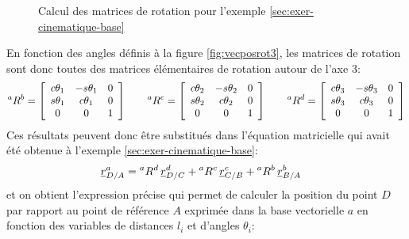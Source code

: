%
\begin{figure}[H]
        \centering
				\hspace{10pt}
				\hspace{10pt}
        \caption{Calcul des matrices de rotation pour l'exemple \ref{sec:exer-cinematique-base}}
				\label{fig:exer-cinematique-base-rotation}
\end{figure}
%
En fonction des angles définis à la figure \ref{fig:vecposrot3}, les matrices de rotation sont donc toutes des matrices élémentaires de rotation autour de l'axe 3:
\begin{align}
{}^aR^b =
\left[ \begin{array}{c c c}
	c\theta_1 & -s\theta_1 & 0 \\
	s\theta_1 & c\theta_1 & 0 \\
	0 & 0 & 1 
\end{array}  \right]
\quad \quad
 {}^aR^c =
\left[ \begin{array}{c c c}
	c\theta_2 & -s\theta_2 & 0 \\
	s\theta_2 & c\theta_2 & 0 \\
	0 & 0 & 1 
\end{array}  \right]
\quad \quad
{}^aR^d =
\left[ \begin{array}{c c c}
	c\theta_3 & -s\theta_3 & 0 \\
	s\theta_3 & c\theta_3 & 0 \\
	0 & 0 & 1 
\end{array}  \right]
\end{align} 
Ces résultats peuvent donc être substitués dans l'équation matricielle qui avait été obtenue à l'exemple \ref{sec:exer-cinematique-base}:
\begin{align}
\underline{r}_{D/A}^a &= {}^aR^d \, \underline{r}_{D/C}^d + {}^aR^c \, \underline{r}_{C/B}^c + {}^aR^b \, \underline{r}_{B/A}^b
\label{eq:ex333cinematique-2}
\end{align} 
et on obtient l’expression précise qui permet de calculer la position du point $D$ par rapport au point de référence $A$ exprimée dans la base vectorielle $a$ en fonction des variables de distances $l_i$ et d'angles $\theta_i$:
